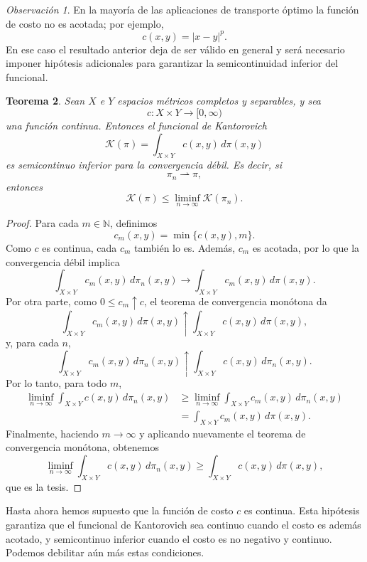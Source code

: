 \documentclass[12pt, a4paper]{amsbook}
\newtheorem{teo}{Teorema}[section]
\theoremstyle{remark}
\newtheorem{obs}[teo]{Observación}
\theoremstyle{definition}
\numberwithin{section}{chapter}
\numberwithin{subsection}{section}
\numberwithin{equation}{section}
\numberwithin{figure}{chapter}
\begin{document}
\begin{obs}
En la mayoría de las aplicaciones de transporte óptimo la función de costo no es acotada; por ejemplo,
\[
c(x,y)=|x-y|^p.
\]
En ese caso el resultado anterior deja de ser válido en general y será necesario imponer hipótesis adicionales para garantizar la semicontinuidad inferior del funcional. 
\end{obs}

\begin{teo}
Sean \(X\) e \(Y\) espacios métricos completos y separables, y sea
\[
c\colon X\times Y\to[0,\infty)
\]
una función continua. Entonces el funcional de Kantorovich
\[
\mathcal K(\pi)=\int_{X\times Y} c(x,y)\,d\pi(x,y)
\]
es semicontinuo inferior para la convergencia débil. Es decir, si
\[
\pi_n\rightharpoonup\pi,
\]
entonces
\[
\mathcal K(\pi)
\le
\liminf_{n\to\infty}\mathcal K(\pi_n).
\]
\end{teo}

\begin{proof}
Para cada \(m\in\mathbb N\), definimos
\[
c_m(x,y)=\min\{c(x,y),m\}.
\]
Como \(c\) es continua, cada \(c_m\) también lo es. Además, \(c_m\) es acotada, por lo que la convergencia débil implica
\[
\int_{X\times Y} c_m(x,y)\,d\pi_n(x,y)
\longrightarrow
\int_{X\times Y} c_m(x,y)\,d\pi(x,y).
\]
Por otra parte, como \(0\le c_m\uparrow c\), el teorema de convergencia monótona da
\[
\int_{X\times Y} c_m(x,y)\,d\pi(x,y)
\uparrow
\int_{X\times Y} c(x,y)\,d\pi(x,y),
\]
y, para cada \(n\),
\[
\int_{X\times Y} c_m(x,y)\,d\pi_n(x,y)
\uparrow
\int_{X\times Y} c(x,y)\,d\pi_n(x,y).
\]
Por lo tanto, para todo \(m\),
\[
\begin{aligned}
\liminf_{n\to\infty}\int_{X\times Y} c(x,y)\,d\pi_n(x,y)
&\ge\liminf_{n\to\infty}\int_{X\times Y} c_m(x,y)\,d\pi_n(x,y)\\
&=\int_{X\times Y} c_m(x,y)\,d\pi(x,y).
\end{aligned}
\]
Finalmente, haciendo \(m\to\infty\) y aplicando nuevamente el teorema de convergencia monótona, obtenemos
\[
\liminf_{n\to\infty}
\int_{X\times Y} c(x,y)\,d\pi_n(x,y)
\ge
\int_{X\times Y} c(x,y)\,d\pi(x,y),
\]
que es la tesis.
\end{proof}

Hasta ahora hemos supuesto que la función de costo \(c\) es continua. Esta
hipótesis garantiza que el funcional de Kantorovich sea continuo cuando el
costo es además acotado, y semicontinuo inferior cuando el costo es
no negativo y continuo. Podemos debilitar aún más estas condiciones.
\end{document}

